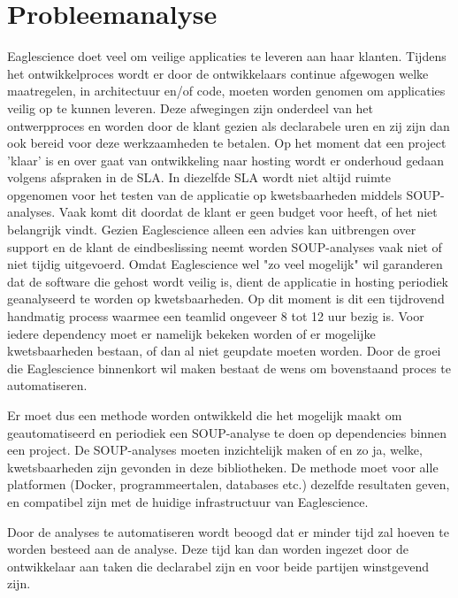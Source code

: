 \section{Probleemanalyse}\label{sec:probleemanalyse}
Eaglescience doet veel om veilige applicaties te leveren aan haar klanten. Tijdens het ontwikkelproces wordt er door de ontwikkelaars continue afgewogen welke maatregelen, in architectuur en/of code, moeten worden genomen om applicaties veilig op te kunnen leveren. Deze afwegingen zijn onderdeel van het ontwerpproces en worden door de klant gezien als declarabele uren en zij zijn dan ook bereid voor deze werkzaamheden te betalen. Op het moment dat een project 'klaar' is en over gaat van ontwikkeling naar hosting wordt er onderhoud gedaan volgens afspraken in de SLA. In diezelfde SLA wordt niet altijd ruimte opgenomen voor het testen van de applicatie op kwetsbaarheden middels SOUP-analyses. Vaak komt dit doordat de klant er geen budget voor heeft, of het niet belangrijk vindt. Gezien Eaglescience alleen een advies kan uitbrengen over support en de klant de eindbeslissing neemt worden SOUP-analyses vaak niet of niet tijdig uitgevoerd. Omdat Eaglescience wel "zo veel mogelijk" wil garanderen dat de software die gehost wordt veilig is, dient de applicatie in hosting periodiek geanalyseerd te worden op kwetsbaarheden. Op dit moment is dit een tijdrovend handmatig process waarmee een teamlid ongeveer 8 tot 12 uur bezig is. Voor iedere dependency moet er namelijk bekeken worden of er mogelijke kwetsbaarheden bestaan, of dan al niet geupdate moeten worden. Door de groei die Eaglescience binnenkort wil maken bestaat de wens om bovenstaand proces te automatiseren.

Er moet dus een methode worden ontwikkeld die het mogelijk maakt om geautomatiseerd en periodiek een SOUP-analyse te doen op dependencies binnen een project. De SOUP-analyses moeten inzichtelijk maken of en zo ja, welke, kwetsbaarheden zijn gevonden in deze bibliotheken. De methode moet voor alle platformen (Docker, programmeertalen, databases etc.) dezelfde resultaten geven, en compatibel zijn met de huidige infrastructuur van Eaglescience.

Door de analyses te automatiseren wordt beoogd dat er minder tijd zal hoeven te worden besteed aan de analyse. Deze tijd kan dan worden ingezet door de ontwikkelaar aan taken die declarabel zijn en voor beide partijen winstgevend zijn.


